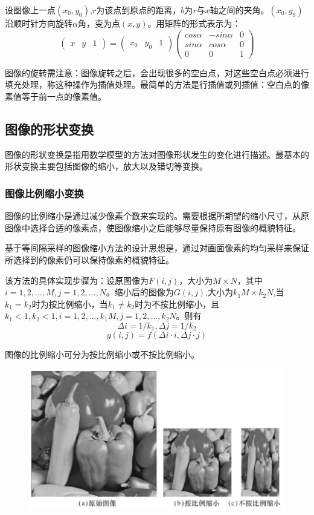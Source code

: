 \documentclass[11pt]{article}
\begin{document}
设图像上一点$(x_0,y_0)$,$r$为该点到原点的距离，$b$为$r$与$x$轴之间的夹角。$(x_0,y_9)$沿顺时针方向旋转$\alpha$角，变为点$(x,y)$。用矩阵的形式表示为：
$$\begin{pmatrix}x & y & 1\end{pmatrix} = \begin{pmatrix}x_0 & y_0 & 1\end{pmatrix}\begin{pmatrix}cos\alpha & -sin\alpha & 0 \\sin\alpha & cos\alpha & 0 \\0 & 0 & 1 \end{pmatrix}$$

图像的旋转需注意：图像旋转之后，会出现很多的空白点，对这些空白点必须进行填充处理，称这种操作为插值处理。最简单的方法是行插值或列插值：空白点的像素值等于前一点的像素值。

\subsection{图像的形状变换}
图像的形状变换是指用数学模型的方法对图像形状发生的变化进行描述。最基本的形状变换主要包括图像的缩小，放大以及错切等变换。
\subsubsection{图像比例缩小变换}
图像的比例缩小是通过减少像素个数来实现的。需要根据所期望的缩小尺寸，从原图像中选择合适的像素点，使图像缩小之后能够尽量保持原有图像的概貌特征。

基于等间隔采样的图像缩小方法的设计思想是，通过对画面像素的均匀采样来保证所选择到的像素仍可以保持像素的概貌特征。

该方法的具体实现步骤为：设原图像为$F(i,j)$，大小为$M\times N$，其中$i = 1,2,...,M,j=1,2,...,N$。缩小后的图像为$G(i,j)$,大小为$k_1M\times k_2N$,当$k_1=k_2$时为按比例缩小，当$k_1\neq k_2$时为不按比例缩小，且$k_1<1,k_2<1,i=1,2,...,k_1M,j=1,2,...,k_2N$。则有
$$\Delta i=1/k_1, \Delta j=1/k_2$$
$$g(i,j)=f(\Delta i\cdot i,\Delta j\cdot j)$$ 

图像的比例缩小可分为按比例缩小或不按比例缩小。
\begin{figure}[H]
	\centering
	\includegraphics[scale=0.5]{18}
\end{figure}
\end{document}

